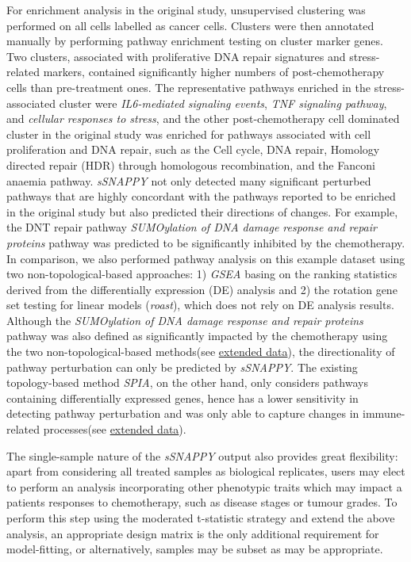 \documentclass[9pt,a4paper,]{extarticle}
\begin{document}
For enrichment analysis in the original study\citep{Zhang2022}, unsupervised clustering was performed on all cells labelled as cancer cells.
Clusters were then annotated manually by performing pathway enrichment testing on cluster marker genes.
Two clusters, associated with proliferative DNA repair signatures and stress-related markers, contained significantly higher numbers of post-chemotherapy cells than pre-treatment ones\citep{Zhang2022}.
The representative pathways enriched in the stress-associated cluster were \emph{IL6-mediated signaling events}, \emph{TNF signaling pathway}, and \emph{cellular responses to stress}, and the other post-chemotherapy cell dominated cluster in the original study was enriched for pathways associated with cell proliferation and DNA repair, such as the Cell cycle, DNA repair, Homology directed repair (HDR) through homologous recombination, and the Fanconi anaemia pathway.
\emph{sSNAPPY} not only detected many significant perturbed pathways that are highly concordant with the pathways reported to be enriched in the original study but also predicted their directions of changes.
For example, the DNT repair pathway \emph{SUMOylation of DNA damage response and repair proteins} pathway was predicted to be significantly inhibited by the chemotherapy.
In comparison, we also performed pathway analysis on this example dataset using two non-topological-based approaches: 1) \emph{GSEA} basing on the ranking statistics derived from the differentially expression (DE) analysis and 2) the rotation gene set testing for linear models (\emph{roast}), which does not rely on DE analysis results.
Although the \emph{SUMOylation of DNA damage response and repair proteins} pathway was also defined as significantly impacted by the chemotherapy using the two non-topological-based methods(see \href{https://github.com/Wenjun-Liu/F1000_sSNAPPY_manuscript/blob/thesis_chapter/Compare.Rmd}{extended data}), the directionality of pathway perturbation can only be predicted by \emph{sSNAPPY}.
The existing topology-based method \emph{SPIA}, on the other hand, only considers pathways containing differentially expressed genes, hence has a lower sensitivity in detecting pathway perturbation and was only able to capture changes in immune-related processes(see \href{https://github.com/Wenjun-Liu/F1000_sSNAPPY_manuscript/blob/thesis_chapter/Compare.Rmd}{extended data}).

The single-sample nature of the \emph{sSNAPPY} output also provides great flexibility: apart from considering all treated samples as biological replicates, users may elect to perform an analysis incorporating other phenotypic traits which may impact a patients responses to chemotherapy, such as disease stages or tumour grades.
To perform this step using the moderated t-statistic strategy and extend the above analysis, an appropriate design matrix is the only additional requirement for model-fitting, or alternatively, samples may be subset as may be appropriate.
\end{document}
